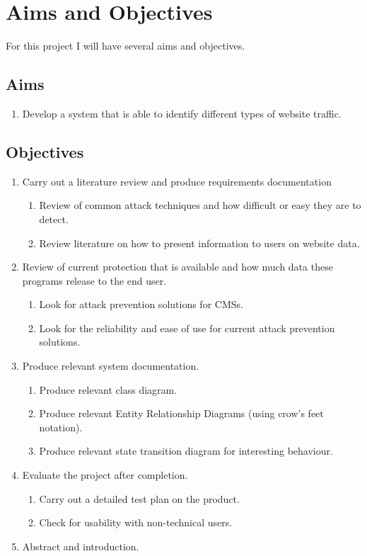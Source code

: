 \section{Aims and Objectives}
For this project I will have several aims and objectives.
\subsection{Aims}
\begin{enumerate}
    \item Develop a system that is able to identify different types of website traffic.
\end{enumerate}

\subsection{Objectives}
\begin{enumerate}
    \item Carry out a literature review and produce requirements documentation
    \begin{enumerate}
        \item Review of common attack techniques and how difficult or easy they are to detect.
        \item Review literature on how to present information to users on website data.
    \end{enumerate}
    \item Review of current protection that is available and how much data these programs release to the end user.
    \begin{enumerate}
        \item Look for attack prevention solutions for CMSs.
        \item Look for the reliability and ease of use for current attack prevention solutions.
    \end{enumerate}
    \item Produce relevant system documentation.
    \begin{enumerate}
        \item Produce relevant class diagram.
        \item Produce relevant Entity Relationship Diagrams (using crow's feet notation). 
        \item Produce relevant state transition diagram for interesting behaviour.
    \end{enumerate}
    \item Evaluate the project after completion.
    \begin{enumerate}
        \item Carry out a detailed test plan on the product.
        \item Check for usability with non-technical users.
    \end{enumerate}
    \item Abstract and introduction.
\end{enumerate}

